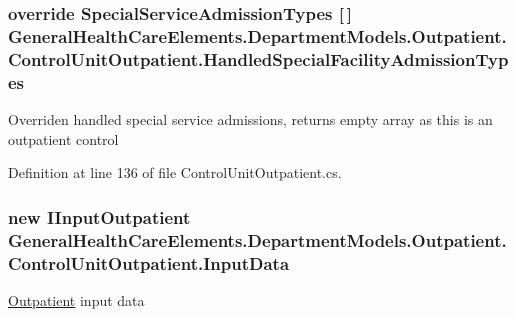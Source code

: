 \subsubsection[{\texorpdfstring{Handled\+Special\+Facility\+Admission\+Types}{HandledSpecialFacilityAdmissionTypes}}]{\setlength{\rightskip}{0pt plus 5cm}override {\bf Special\+Service\+Admission\+Types} \mbox{[}$\,$\mbox{]} General\+Health\+Care\+Elements.\+Department\+Models.\+Outpatient.\+Control\+Unit\+Outpatient.\+Handled\+Special\+Facility\+Admission\+Types\hspace{0.3cm}{\ttfamily [get]}}\hypertarget{class_general_health_care_elements_1_1_department_models_1_1_outpatient_1_1_control_unit_outpatient_a56b71d567626a0e8dffd112885386f53}{}\label{class_general_health_care_elements_1_1_department_models_1_1_outpatient_1_1_control_unit_outpatient_a56b71d567626a0e8dffd112885386f53}


Overriden handled special service admissions, returns empty array as this is an outpatient control 



Definition at line 136 of file Control\+Unit\+Outpatient.\+cs.

\subsubsection[{\texorpdfstring{Input\+Data}{InputData}}]{\setlength{\rightskip}{0pt plus 5cm}new {\bf I\+Input\+Outpatient} General\+Health\+Care\+Elements.\+Department\+Models.\+Outpatient.\+Control\+Unit\+Outpatient.\+Input\+Data\hspace{0.3cm}{\ttfamily [get]}}\hypertarget{class_general_health_care_elements_1_1_department_models_1_1_outpatient_1_1_control_unit_outpatient_a8baf50eee922235245e9425cb0f3cd52}{}\label{class_general_health_care_elements_1_1_department_models_1_1_outpatient_1_1_control_unit_outpatient_a8baf50eee922235245e9425cb0f3cd52}


\hyperlink{namespace_general_health_care_elements_1_1_department_models_1_1_outpatient}{Outpatient} input data 



